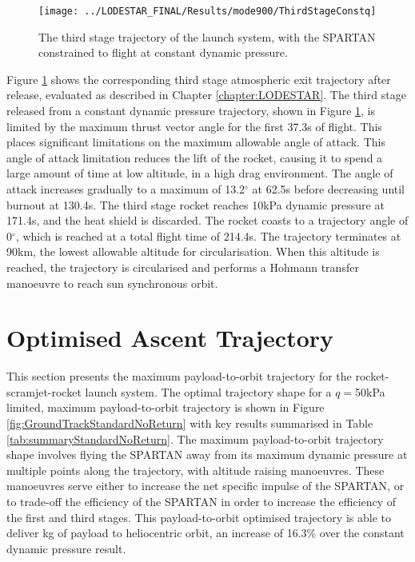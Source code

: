 \begin{figure}[ht!]
\centering
\texttt{[image: ../LODESTAR\_FINAL/Results/mode900/ThirdStageConstq]}
\caption{The third stage trajectory of the launch system, with the SPARTAN constrained to flight at constant dynamic pressure.}
\label{fig:ThirdStageConstq}
\end{figure}

Figure \ref{fig:ThirdStageConstq} shows the corresponding third stage atmospheric exit trajectory after release, evaluated as described in Chapter \ref{chapter:LODESTAR}. The third stage released from a constant dynamic pressure trajectory, shown in Figure \ref{fig:ThirdStageConstq}, is limited by the maximum thrust vector angle for the first 37.3s of flight. This places significant limitations on the maximum allowable angle of attack. This angle of attack limitation reduces the lift of the rocket, causing it to spend a large amount of time at low altitude, in a high drag environment. The angle of attack increases gradually to a maximum of 13.2$^\circ$ at 62.5s before decreasing until burnout at 130.4s. The third stage rocket reaches 10kPa dynamic pressure at 171.4s, and the heat shield is discarded. The rocket coasts to a trajectory angle of 0$^\circ$, which is reached at a total flight time of 214.4s. The trajectory terminates at 90km, the lowest allowable altitude for circularisation. 
When this altitude is reached, the trajectory is circularised and performs a Hohmann transfer manoeuvre to reach sun synchronous orbit.








\section{Optimised Ascent Trajectory}\label{sec:optimisednoreturn}

This section presents the maximum payload-to-orbit trajectory for the rocket-scramjet-rocket launch system. 
The optimal trajectory shape for a $q=$50kPa limited, maximum payload-to-orbit trajectory is shown in Figure \ref{fig:GroundTrackStandardNoReturn} with key results summarised in Table \ref{tab:summaryStandardNoReturn}. The maximum payload-to-orbit trajectory shape involves flying the SPARTAN away from its maximum dynamic pressure at multiple points along the trajectory, with altitude raising manoeuvres. These manoeuvres serve either to increase the net specific impulse of the SPARTAN, or to trade-off the efficiency of the SPARTAN in order to increase the efficiency of the first and third stages. 
This payload-to-orbit optimised trajectory is able to deliver \PayloadToOrbitStandardNoReturn kg of payload to heliocentric orbit, an increase of 16.3\% over the constant dynamic pressure result.

